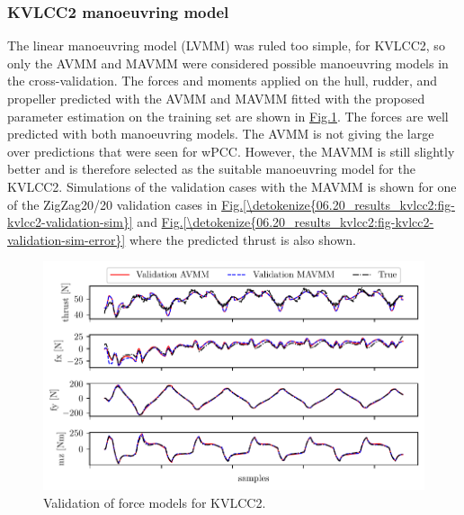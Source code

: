 \subsubsection{KVLCC2 manoeuvring model}
\label{\detokenize{06.20_results_kvlcc2:kvlcc2-manoeuvring-model}}

The linear manoeuvring model (LVMM) was ruled too simple, for KVLCC2, so only the AVMM and MAVMM were considered possible manoeuvring models in the cross-validation.
The forces and moments applied on the hull, rudder, and propeller predicted with the AVMM and MAVMM fitted with the proposed parameter estimation on the training set are shown in \hyperref[\detokenize{06.20_results_kvlcc2:fig-kvlcc2-validation-forces}]{Fig.\@ \ref{\detokenize{06.20_results_kvlcc2:fig-kvlcc2-validation-forces}}}.
The forces are well predicted with both manoeuvring models. The AVMM is not giving the large over predictions that were seen for wPCC. However, the MAVMM is still slightly better and is therefore selected as the suitable manoeuvring model for the KVLCC2.
Simulations of the validation cases with the MAVMM is shown for one of the ZigZag20/20 validation cases in \hyperref[\detokenize{06.20_results_kvlcc2:fig-kvlcc2-validation-sim}]{Fig.\@ \ref{\detokenize{06.20_results_kvlcc2:fig-kvlcc2-validation-sim}}} and \hyperref[\detokenize{06.20_results_kvlcc2:fig-kvlcc2-validation-sim-error}]{Fig.\@ \ref{\detokenize{06.20_results_kvlcc2:fig-kvlcc2-validation-sim-error}}} where the predicted thrust is also shown.

\begin{figure}[!htb]
\centering
\includegraphics[width=\textwidth]{kappa/images/13.pdf}
\caption{Validation of force models for KVLCC2.}\label{\detokenize{06.20_results_kvlcc2:fig-kvlcc2-validation-forces}}\end{figure}

